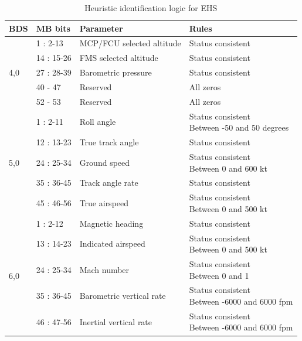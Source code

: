 \begin{table}
\footnotesize
\centering
\small
\caption{Heuristic identification logic for EHS}
\label{tb:bds_rule_ehs}
\begin{tabular}{|l|l|l|l|}
\hline
\textbf{BDS} & \textbf{MB bits} & \textbf{Parameter} & \textbf{Rules} \\ \hline \hline
\multirow{5}{*}{4,0} & 1 : 2-13 & MCP/FCU selected altitude & Status consistent \\ \cline{2-4} 
& 14 : 15-26 & FMS selected altitude & Status consistent \\ \cline{2-4} 
& 27 : 28-39 & Barometric pressure & Status consistent \\ \cline{2-4} 
& 40 - 47 & Reserved & All zeros \\ \cline{2-4} 
& 52 - 53 & Reserved & All zeros \\ \hline \hline
\multirow{5}{*}{5,0} & 1 : 2-11 & Roll angle & \makecell*{Status consistent \\ Between -50 and 50 degrees} \\ \cline{2-4} 
& 12 : 13-23 & True track angle & Status consistent \\ \cline{2-4} 
& 24 : 25-34 & Ground speed & \makecell*{Status consistent \\ Between 0 and 600 kt} \\ \cline{2-4} 
& 35 : 36-45 & Track angle rate & Status consistent \\ \cline{2-4} 
& 45 : 46-56 & True airspeed & \makecell*{Status consistent \\ Between 0 and 500 kt} \\ \hline \hline
\multirow{5}{*}{6,0} & 1 : 2-12 & Magnetic heading & Status consistent \\ \cline{2-4} 
& 13 : 14-23 & Indicated airspeed & \makecell*{Status consistent \\ Between 0 and 500 kt} \\ \cline{2-4} 
& 24 : 25-34 & Mach number & \makecell*{Status consistent \\ Between 0 and 1}\\ \cline{2-4} 
& 35 : 36-45 & Barometric vertical rate & \makecell*{Status consistent \\ Between -6000 and 6000 fpm} \\ \cline{2-4} 
& 46 : 47-56 & Inertial vertical rate & \makecell*{Status consistent \\ Between -6000 and 6000 fpm} \\ \hline
\end{tabular}
\end{table}


